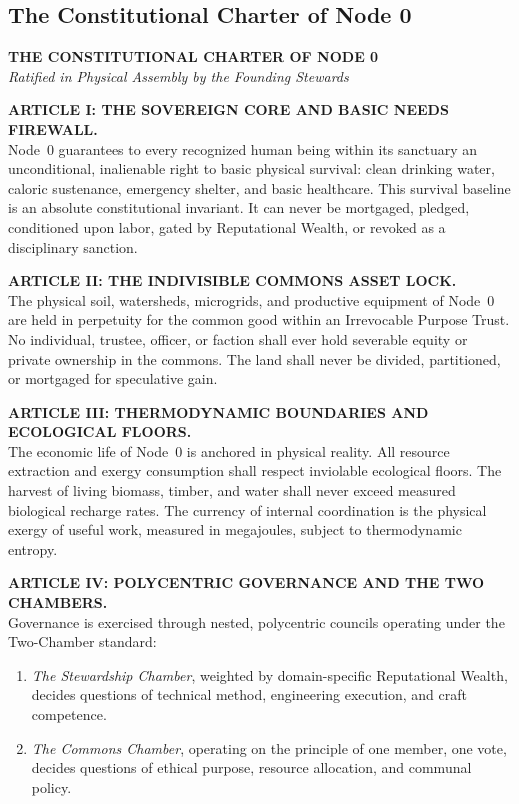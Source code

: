 \subsection{The Constitutional Charter of Node 0}
\label{subsec:constitutional_charter}

\begin{center}
\textbf{\Large THE CONSTITUTIONAL CHARTER OF NODE 0} \\
\textit{Ratified in Physical Assembly by the Founding Stewards}
\end{center}

\vspace{0.5em}
\noindent\textbf{ARTICLE I: THE SOVEREIGN CORE AND BASIC NEEDS FIREWALL.} \\
Node~0 guarantees to every recognized human being within its sanctuary an unconditional, inalienable right to basic physical survival: clean drinking water, caloric sustenance, emergency shelter, and basic healthcare. This survival baseline is an absolute constitutional invariant. It can never be mortgaged, pledged, conditioned upon labor, gated by Reputational Wealth, or revoked as a disciplinary sanction.

\vspace{0.5em}
\noindent\textbf{ARTICLE II: THE INDIVISIBLE COMMONS ASSET LOCK.} \\
The physical soil, watersheds, microgrids, and productive equipment of Node~0 are held in perpetuity for the common good within an Irrevocable Purpose Trust. No individual, trustee, officer, or faction shall ever hold severable equity or private ownership in the commons. The land shall never be divided, partitioned, or mortgaged for speculative gain.

\vspace{0.5em}
\noindent\textbf{ARTICLE III: THERMODYNAMIC BOUNDARIES AND ECOLOGICAL FLOORS.} \\
The economic life of Node~0 is anchored in physical reality. All resource extraction and exergy consumption shall respect inviolable ecological floors. The harvest of living biomass, timber, and water shall never exceed measured biological recharge rates. The currency of internal coordination is the physical exergy of useful work, measured in megajoules, subject to thermodynamic entropy.

\vspace{0.5em}
\noindent\textbf{ARTICLE IV: POLYCENTRIC GOVERNANCE AND THE TWO CHAMBERS.} \\
Governance is exercised through nested, polycentric councils operating under the Two-Chamber standard:
\begin{enumerate}
    \item \textit{The Stewardship Chamber}, weighted by domain-specific Reputational Wealth, decides questions of technical method, engineering execution, and craft competence.
    \item \textit{The Commons Chamber}, operating on the principle of one member, one vote, decides questions of ethical purpose, resource allocation, and communal policy.
\end{enumerate}

